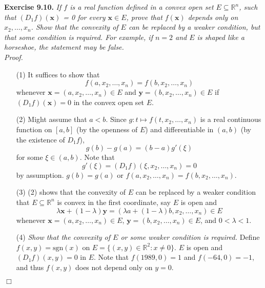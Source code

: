 \documentclass{article}
\begin{document}



\textbf{Exercise 9.10.}
\emph{If $f$ is a real function defined in a convex open set $E \subseteq \mathbb{R}^n$,
such that $(D_1 f)(\mathbf{x})$ = 0 for every $\mathbf{x} \in E$,
prove that $f(\mathbf{x})$ depends only on $x_2, \ldots, x_n$.
Show that the convexity of $E$ can be replaced by a weaker condition,
but that some condition is required.
For example, if $n=2$ and $E$ is shaped like a horseshoe,
the statement may be false.} \\

\emph{Proof.}
\begin{enumerate}
\item[(1)]
  It suffices to show that
  \[
    f(a, x_2, \ldots, x_n) = f(b, x_2, \ldots, x_n)
  \]
  whenever $\mathbf{x} = (a, x_2, \ldots, x_n) \in E$
  and $\mathbf{y} = (b, x_2, \ldots, x_n) \in E$
  if $(D_1 f)(\mathbf{x}) = 0$ in the convex open set $E$.

\item[(2)]
  Might assume that $a < b$.
  Since $g: t \mapsto f(t, x_2, \ldots, x_n)$ is a real continuous function
  on $[a,b]$ (by the openness of $E$) and differentiable in $(a,b)$
  (by the existence of $D_1 f$),
  \[
    g(b) - g(a) = (b - a)g'(\xi)
  \]
  for some $\xi \in (a,b)$.
  Note that
  \[
    g'(\xi) = (D_1 f)(\xi, x_2, \ldots, x_n) = 0
  \]
  by assumption. $g(b) = g(a)$ or $f(a, x_2, \ldots, x_n) = f(b, x_2, \ldots, x_n)$.

\item[(3)]
  (2) shows that the convexity of $E$ can be replaced by a weaker condition
  that $E \subseteq \mathbb{R}^n $ is convex in the first coordinate, say
  $E$ is open and
  \[
    \lambda \mathbf{x} + (1-\lambda) \mathbf{y}
    = (\lambda a + (1-\lambda) b, x_2, \ldots, x_n) \in E
  \]
  whenever
  $\mathbf{x} = (a, x_2, \ldots, x_n) \in E$,
  $\mathbf{y} = (b, x_2, \ldots, x_n) \in E$, and $0 < \lambda < 1$.

\item[(4)]
  \emph{Show that the convexity of $E$ or some weaker condition is required.}
  Define $f(x,y) = \mathrm{sgn}(x)$ on $E = \{ (x,y) \in \mathbb{R}^2 : x \neq 0 \}$.
  $E$ is open and $(D_1 f)(x,y) = 0$ in $E$.
  Note that $f(1989, 0) = 1$ and $f(-64, 0) = -1$,
  and thus $f(x,y)$ does not depend only on $y = 0$.
\end{enumerate}
$\Box$ \\\\
\end{document}

